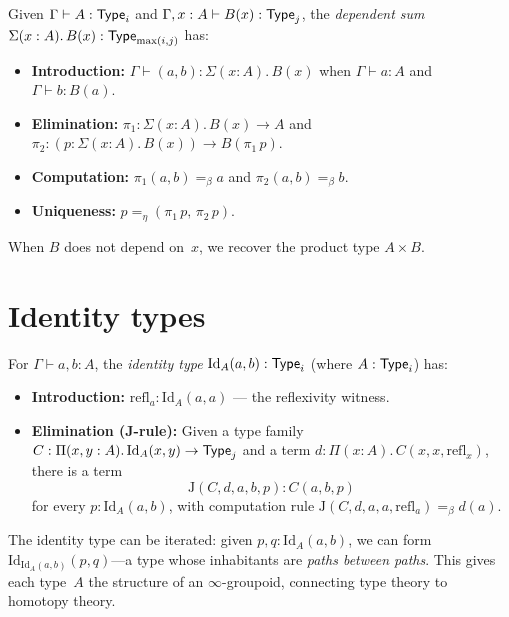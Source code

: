 \begin{definition}
\label{def:sigma}
Given $\Gamma \vdash A : \mathsf{Type}_i$ and
$\Gamma, x : A \vdash B(x) : \mathsf{Type}_j$, the \emph{dependent sum}
$\Sigma(x : A).\, B(x) : \mathsf{Type}_{\max(i,j)}$ has:
\begin{itemize}[nosep]
\item \textbf{Introduction:}
  $\Gamma \vdash (a, b) : \Sigma(x:A).\, B(x)$
  when $\Gamma \vdash a : A$ and $\Gamma \vdash b : B(a)$.
\item \textbf{Elimination:}
  $\pi_1 : \Sigma(x:A).\, B(x) \to A$ and
  $\pi_2 : (p : \Sigma(x:A).\, B(x)) \to B(\pi_1\, p)$.
\item \textbf{Computation:}
  $\pi_1(a,b) =_\beta a$ and $\pi_2(a,b) =_\beta b$.
\item \textbf{Uniqueness:}
  $p =_\eta (\pi_1\, p,\, \pi_2\, p)$.
\end{itemize}
When $B$ does not depend on~$x$, we recover the product type
$A \times B$.
\end{definition}

\section{Identity types}
\label{sec:identity}

\begin{definition}
\label{def:identity}
For $\Gamma \vdash a, b : A$, the \emph{identity type}
$\mathrm{Id}_A(a,b) : \mathsf{Type}_i$ (where $A : \mathsf{Type}_i$) has:
\begin{itemize}[nosep]
\item \textbf{Introduction:}
  $\mathrm{refl}_a : \mathrm{Id}_A(a,a)$ --- the reflexivity witness.
\item \textbf{Elimination (J-rule):}  Given a type family
  $C : \Pi(x,y:A).\, \mathrm{Id}_A(x,y) \to \mathsf{Type}_j$ and a term
  $d : \Pi(x:A).\, C(x,x,\mathrm{refl}_x)$, there is a term
  \[
    \mathrm{J}(C,d,a,b,p) : C(a,b,p)
  \]
  for every $p : \mathrm{Id}_A(a,b)$, with computation rule
  $\mathrm{J}(C,d,a,a,\mathrm{refl}_a) =_\beta d(a)$.
\end{itemize}
\end{definition}

\begin{remark}
The identity type can be iterated: given $p, q : \mathrm{Id}_A(a,b)$,
we can form $\mathrm{Id}_{\mathrm{Id}_A(a,b)}(p,q)$---a type whose
inhabitants are \emph{paths between paths}.  This gives each type~$A$
the structure of an $\infty$-groupoid, connecting type theory to
homotopy theory.
\end{remark}

